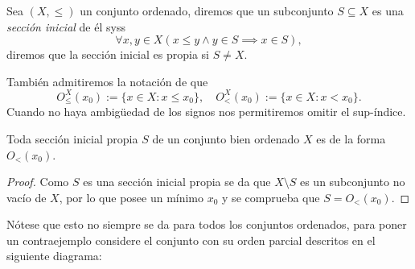 \documentclass[11pt,a4paper]{book}
\begin{document}
\begin{mydef}
	Sea $(X,\leq)$ un conjunto ordenado, diremos que un subconjunto $S\subseteq X$ es una \textit{sección inicial} de él syss
	$$\forall x,y\in X(x\leq y\wedge y\in S\implies x\in S),$$
	diremos que la sección inicial es propia si $S\neq X$.

	También admitiremos la notación de que
	$$O_\leq^X(x_0):=\{x\in X:x\leq x_0\},\quad O_<^X(x_0):=\{x\in X:x<x_0\}.$$
	Cuando no haya ambigüedad de los signos nos permitiremos omitir el sup-índice.
\end{mydef}
\begin{prop}
	Toda sección inicial propia $S$ de un conjunto bien ordenado $X$ es de la forma $O_<(x_0)$.
\end{prop}
\begin{proof}
	Como $S$ es una sección inicial propia se da que $X\setminus S$ es un subconjunto no vacío de $X$, por lo que posee un mínimo $x_0$ y se comprueba que $S=O_<(x_0)$.
\end{proof}
Nótese que esto no siempre se da para todos los conjuntos ordenados, para poner un contraejemplo considere el conjunto con su orden parcial descritos en el siguiente diagrama:
\begin{figure}
	\centering
	\caption{}
\end{figure}
\end{document}
